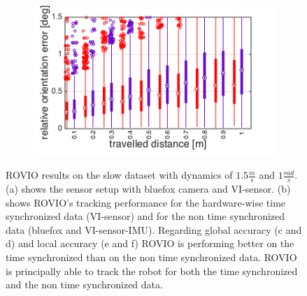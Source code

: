 \begin{figure}[h]
\begin{subfigure}[b]{0.42\textwidth}
    \caption{}
  \end{subfigure}
  \hfill
  \begin{subfigure}[b]{0.42\textwidth}
    \includegraphics[width=\textwidth]{images/slow/slow_roe.png}
    \caption{}
  \end{subfigure}
   \caption{ROVIO results on the slow dataset with dynamics of $1.5\frac{m}{s}$ and $1\frac{rad}{s}$. (a) shows the sensor setup with bluefox camera and VI-sensor. (b) shows ROVIO's tracking performance for the hardware-wise time synchronized data (VI-sensor) and for the non time synchronized data (bluefox and VI-sensor-IMU). Regarding global accuracy (c and d) and local accuracy (e and f) ROVIO is performing better on the time synchronized than on the non time synchronized data. ROVIO is principally able to track the robot for both the time synchronized and the non time synchronized data.}
   \label{pics:appendix_slow}
\end{figure}

